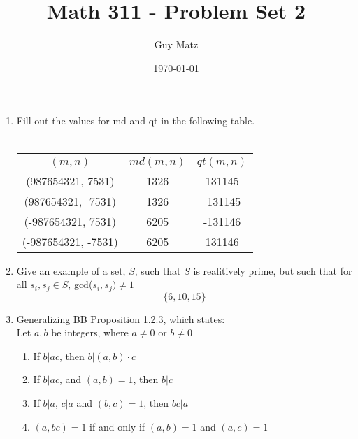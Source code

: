 \documentclass[11pt]{article}
\title{\textbf{Math 311 - Problem Set 2}}
\author{Guy Matz}
\date{\today}
\begin{document}


\begin{enumerate}  %
\item Fill out the values for md and qt in the following table.\\
\\
\begin{center}
  \begin{tabular}{ c | c | c }
    $(m,n)$ & $md(m,n)$ & $qt(m,n)$ \\ \hline
    (987654321, 7531) & 1326 & 131145 \\ \hline
    (987654321, -7531) & 1326 & -131145 \\ \hline
    (-987654321, 7531) & 6205 & -131146 \\ \hline
    (-987654321, -7531) & 6205 & 131146 \\ \hline
  \end{tabular}
\end{center}

\newpage %
\item Give an example of a set, $S$, such that $S$ is realitively prime, but such that for all $s_i, s_j \in S$, gcd($s_i, s_j) \neq 1$
$$\{6,10,15\}$$

\newpage %
\item Generalizing BB Proposition 1.2.3, which states: \\
Let $a, b$ be integers, where $a \neq 0$ or $b \neq 0$
\begin{enumerate}
\item If $b | ac$, then $b | (a,b) \cdot c$
\item If $b | ac$, and $(a, b) = 1$, then $b|c$
\item If $b | a$, $c | a$ and $(b, c) = 1$, then $bc|a$
\item $(a, bc) =1 $ if and only if $(a,b) = 1$ and $(a,c) = 1$
\end{enumerate}


\end{enumerate}
\end{document}
